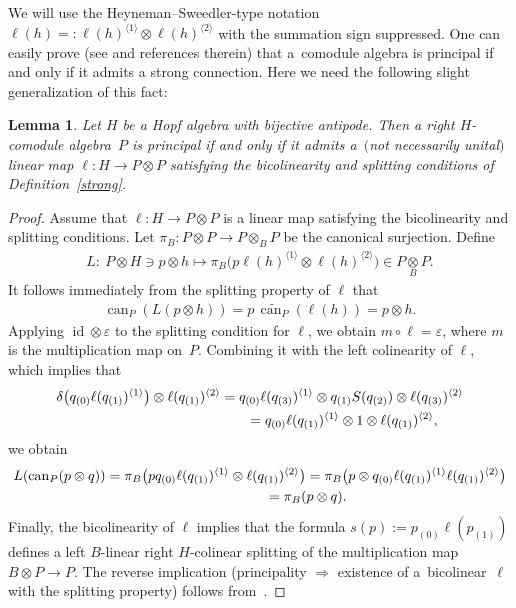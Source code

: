 \documentclass[11pt]{article}
\numberwithin{equation}{section}
\newtheorem{Lemma}[Theorem]{Lemma}
{ \theoremstyle{definition}
\newtheorem{Definition}[Theorem]{Definition}
\newtheorem{Example}[Theorem]{Example}}
\begin{document}
We will use the  Heyneman--Sweedler-type notation
$
\ell(h)=:\ell(h)^{\langle 1 \rangle}\otimes
 \ell(h)^{\langle 2 \rangle}
$
 with the summation sign suppressed.
 One can easily prove (see \cite[p.~599]{hkmz11} and references therein) that
a~comodule algebra is principal if and only if it admits a strong
connection.
Here we need the following slight generalization of this fact:
\begin{Lemma}\label{general}
Let $H$ be a Hopf algebra with bijective antipode. Then a right $H$-comodule algebra~$P$ is principal if and
only if it admits a~$($not necessarily unital$)$ linear map $\ell \colon H \rightarrow  P \otimes  P$ satisfying the
bicolinearity and splitting conditions of Definition~{\rm \ref{strong}}.
\end{Lemma}

\begin{proof}
Assume that $\ell \colon H \rightarrow  P \otimes  P$ is a linear map satisfying the bicolinearity and splitting
conditions.
Let $\pi_B\colon P\otimes P\to P\otimes_BP$ be the canonical surjection. Def\/ine
\begin{gather*}
L\colon \ P\otimes H\ni p\otimes h\longmapsto \pi_B\big(p \ell(h)^{\langle 1\rangle}\otimes\ell(h)^{\langle 2\rangle}\big)\in P\underset{B}{\otimes}P.
\end{gather*}
It follows immediately from the  splitting property of $\ell$ that
\begin{gather*}
\operatorname{can}_P(L(p\otimes h))= p \, \widetilde{\operatorname{can}_P}(\ell(h))=p\otimes h.
\end{gather*}
Applying $\operatorname{id}\otimes\varepsilon$ to the splitting condition for $\ell$, we obtain $m\circ\ell=\varepsilon$, where $m$ is
the multiplication map on~$P$.
Combining it with the left colinearity of $\ell$, which implies that
\begin{gather*}
\delta\big(q_{(0)}\ell(q_{(1)})^{\langle 1\rangle}\big)\otimes\ell(q_{(1)})^{\langle 2\rangle}
=q_{(0)}\ell(q_{(3)})^{\langle 1\rangle}\otimes q_{(1)}S(q_{(2)})\otimes\ell(q_{(3)})^{\langle 2\rangle}\\
\hphantom{\delta\big(q_{(0)}\ell(q_{(1)})^{\langle 1\rangle}\big)\otimes\ell(q_{(1)})^{\langle 2\rangle}}{}
=q_{(0)}\ell(q_{(1)})^{\langle 1\rangle}\otimes 1\otimes\ell(q_{(1)})^{\langle 2\rangle},
\end{gather*}
we obtain
\begin{gather*}
L(\operatorname{can}_P(p\otimes q)) = \pi_B \big(pq_{(0)} \ell(q_{(1)})^{\langle 1\rangle}
 \otimes  \ell(q_{(1)})^{\langle 2\rangle}\big)
 = \pi_B \big(p \otimes q_{(0)} \ell(q_{(1)})^{\langle 1\rangle} \ell(q_{(1)})^{\langle 2\rangle}\big)
 \\
\hphantom{L(\operatorname{can}_P(p\otimes q))}{}
=  \pi_B(p\otimes q).
\end{gather*}
Finally, the bicolinearity of $\ell$ implies that the formula $s(p):= p_{(0)}\ell(p_{(1)})$ def\/ines a left $B$-linear
right $H$-colinear splitting
of the multiplication map $B\otimes P\to P$. The reverse implication (principality $\Rightarrow$ existence of a~bicolinear~$\ell$ with the splitting property)
follows from~\cite[Lemma~2.2]{bh04}.
\end{proof}
\end{document}
